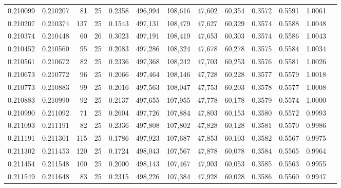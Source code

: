 \begin{tabular}{rrrrrrrrrrrrr}
0.210099 & 0.210207 &    81 &  25 &                                     0.2358 & 496,994 & 108,616 &  47,602 &  60,354 & 0.3572 & 0.5591 & 1.0061 \\
0.210207 & 0.210374 &   137 &  25 &                                     0.1543 & 497,131 & 108,479 &  47,627 &  60,329 & 0.3574 & 0.5588 & 1.0048 \\
0.210374 & 0.210448 &    60 &  26 &                                     0.3023 & 497,191 & 108,419 &  47,653 &  60,303 & 0.3574 & 0.5586 & 1.0043 \\
0.210452 & 0.210560 &    95 &  25 &                                     0.2083 & 497,286 & 108,324 &  47,678 &  60,278 & 0.3575 & 0.5584 & 1.0034 \\
0.210561 & 0.210672 &    82 &  25 &                                     0.2336 & 497,368 & 108,242 &  47,703 &  60,253 & 0.3576 & 0.5581 & 1.0026 \\
0.210673 & 0.210772 &    96 &  25 &                                     0.2066 & 497,464 & 108,146 &  47,728 &  60,228 & 0.3577 & 0.5579 & 1.0018 \\
0.210773 & 0.210883 &    99 &  25 &                                     0.2016 & 497,563 & 108,047 &  47,753 &  60,203 & 0.3578 & 0.5577 & 1.0008 \\
0.210883 & 0.210990 &    92 &  25 &                                     0.2137 & 497,655 & 107,955 &  47,778 &  60,178 & 0.3579 & 0.5574 & 1.0000 \\
0.210990 & 0.211092 &    71 &  25 &                                     0.2604 & 497,726 & 107,884 &  47,803 &  60,153 & 0.3580 & 0.5572 & 0.9993 \\
0.211093 & 0.211191 &    82 &  25 &                                     0.2336 & 497,808 & 107,802 &  47,828 &  60,128 & 0.3581 & 0.5570 & 0.9986 \\
0.211191 & 0.211301 &   115 &  25 &                                     0.1786 & 497,923 & 107,687 &  47,853 &  60,103 & 0.3582 & 0.5567 & 0.9975 \\
0.211302 & 0.211453 &   120 &  25 &                                     0.1724 & 498,043 & 107,567 &  47,878 &  60,078 & 0.3584 & 0.5565 & 0.9964 \\
0.211454 & 0.211548 &   100 &  25 &                                     0.2000 & 498,143 & 107,467 &  47,903 &  60,053 & 0.3585 & 0.5563 & 0.9955 \\
0.211549 & 0.211648 &    83 &  25 &                                     0.2315 & 498,226 & 107,384 &  47,928 &  60,028 & 0.3586 & 0.5560 & 0.9947 \\

\end{tabular}
